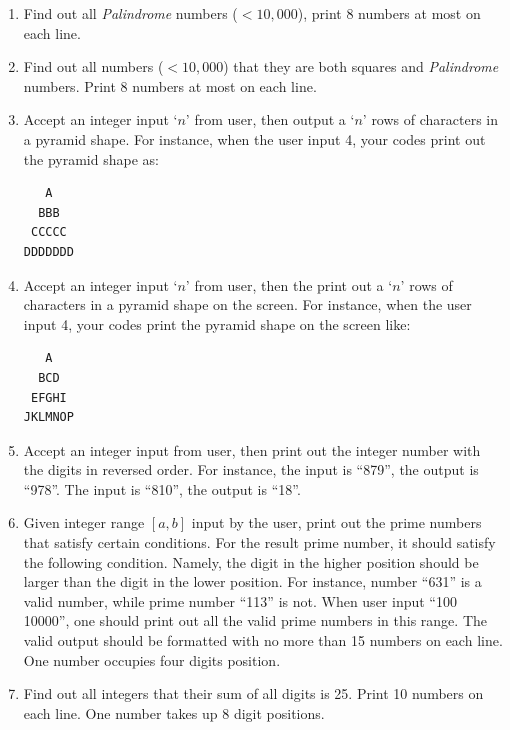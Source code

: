 \documentclass[11pt]{article}
\begin{document}
\begin{enumerate}
    \item Find out all \textit{Palindrome} numbers ($< 10,000$), print 8 numbers at most on each line.
    
    \item Find out all numbers ($< 10,000$) that they are both squares and \textit{Palindrome} numbers. Print 8 numbers at most on each line.
    
    \item Accept an integer input `$n$’ from user, then output a `$n$’ rows of characters in a pyramid shape. For instance, when the user input 4, your codes print out the pyramid shape as:
\\
\begin{lstlisting}
   A
  BBB
 CCCCC
DDDDDDD
\end{lstlisting}
    
    \item Accept an integer input `$n$’ from user, then the print out a `$n$’ rows of characters in a pyramid shape on the screen. For instance, when the user input 4, your codes print the pyramid shape on the screen like:
\\
\begin{lstlisting}
   A
  BCD
 EFGHI
JKLMNOP
\end{lstlisting}
    
    \item Accept an integer input from user, then print out the integer number with the digits in reversed order. For instance, the input is ``879'', the output is ``978''. The input is ``810'', the output is ``18''.
    
    \item Given integer range $[a, b]$ input by the user, print out the prime numbers that satisfy certain conditions. For the result prime number, it should satisfy the following condition. Namely, the digit in the higher position should be larger than the digit in the lower position. For instance, number ``631'' is a valid number, while prime number ``113'' is not. When user input ``100 10000'', one should print out all the valid prime numbers in this range. The valid output should be formatted with no more than 15 numbers on each line. One number occupies four digits position.
    
    \item Find out all integers that their sum of all digits is 25. Print 10 numbers on each line. One number takes up 8 digit positions.
\end{enumerate}
\end{document}
